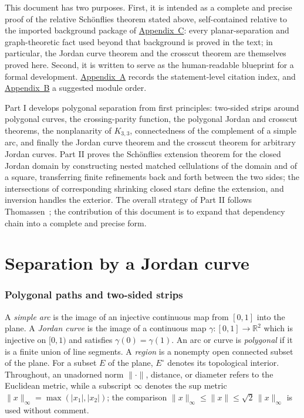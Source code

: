 \documentclass[11pt]{article}
\theoremstyle{mainplain}
\theoremstyle{mainroman}
\theoremstyle{definition}
\numberwithin{equation}{section}
\begin{document}
This document has two purposes. First, it is intended as a complete
and precise proof of the relative Schönflies theorem stated above,
self-contained relative to the imported background package of
\hyperref[app:background]{Appendix~C}: every planar-separation and
graph-theoretic fact used beyond that background is proved in the
text; in
particular, the Jordan curve theorem and the crosscut theorem are
themselves proved here. Second, it is written to
serve as the human-readable blueprint for a formal development.
\hyperref[app:dependency-graph]{Appendix~A} records the
statement-level citation index, and
\hyperref[app:module-order]{Appendix~B} a suggested module order.

Part I develops polygonal separation from first principles: two-sided
strips around polygonal curves, the crossing-parity function, the
polygonal Jordan and crosscut theorems, the nonplanarity of $K_{3,3}$,
connectedness of the complement of a simple arc, and finally the
Jordan curve theorem and the crosscut theorem for arbitrary Jordan
curves. Part II proves the Schönflies extension theorem for the closed
Jordan domain by constructing nested matched cellulations of the
domain and of a square, transferring finite refinements back and forth
between the two sides; the intersections of corresponding shrinking
closed stars define the extension, and inversion handles the
exterior. The overall strategy of Part II follows
Thomassen~\cite{Thomassen}; the contribution of this document is to
expand that dependency chain into a complete and precise form.

\part{Separation by a Jordan curve}

\section{Polygonal paths and two-sided strips}

A \emph{simple arc} is the image of an injective continuous map from
$[0,1]$ into the plane. A \emph{Jordan curve} is the image of a
continuous map $\gamma:[0,1]\to\mathbb R^2$ which is injective on
$[0,1)$ and satisfies $\gamma(0)=\gamma(1)$. An arc or curve is
\emph{polygonal} if it is a finite union of line segments. A
\emph{region} is a nonempty open connected subset of the plane. For a
subset $E$ of the plane, $E^\circ$ denotes its topological interior.
Throughout, an unadorned norm $\|\cdot\|$, distance, or diameter refers
to the Euclidean metric, while a subscript $\infty$ denotes the sup
metric $\|x\|_\infty=\max(|x_1|,|x_2|)$; the comparison
$\|x\|_\infty\le\|x\|\le\sqrt2\,\|x\|_\infty$ is used without comment.
\end{document}
